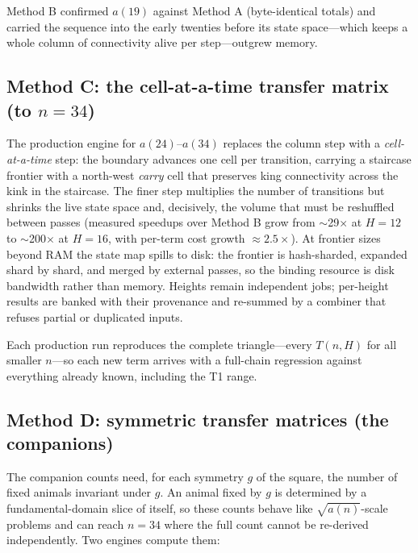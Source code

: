 \documentclass[11pt]{article}
\newcommand{\tierone}{\textsf{T1}}
\begin{document}
Method B confirmed $a(19)$ against Method A (byte-identical totals) and
carried the sequence into the early twenties before its state space---which
keeps a whole column of connectivity alive per step---outgrew memory.

\subsection{Method C: the cell-at-a-time transfer matrix (to $n=34$)}
\label{sec:methodC}

The production engine for $a(24)$--$a(34)$ replaces the column step with a
\emph{cell-at-a-time} step: the boundary advances one cell per transition,
carrying a staircase frontier with a north-west \emph{carry} cell that
preserves king connectivity across the kink in the staircase. The finer step
multiplies the number of transitions but shrinks the live state space and,
decisively, the volume that must be reshuffled between passes (measured
speedups over Method B grow from $\sim$29$\times$ at $H=12$ to
$\sim$200$\times$ at $H=16$, with per-term cost growth
$\approx2.5\times$). At frontier sizes beyond RAM the state map spills to
disk: the frontier is hash-sharded, expanded shard by shard, and merged by
external passes, so the binding resource is disk bandwidth rather than
memory. Heights remain independent jobs; per-height results are banked with
their provenance and re-summed by a combiner that refuses partial or
duplicated inputs.

Each production run reproduces the complete triangle---every $T(n,H)$ for all
smaller $n$---so each new term arrives with a full-chain regression against
everything already known, including the \tierone{} range.

\subsection{Method D: symmetric transfer matrices (the companions)}
\label{sec:methodD}

The companion counts need, for each symmetry $g$ of the square, the number of
fixed animals invariant under $g$. An animal fixed by $g$ is determined by a
fundamental-domain slice of itself, so these counts behave like
$\sqrt{a(n)}$-scale problems and can reach $n=34$ where the full count cannot
be re-derived independently. Two engines compute them:
\end{document}
